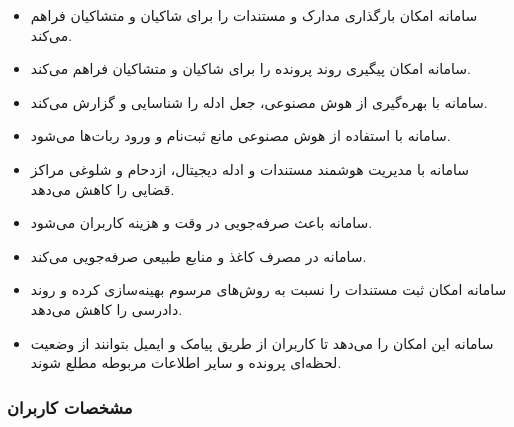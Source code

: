 \documentclass[12pt,a4paper,oneside]{article}
\begin{document}
	\begin{itemize}
		\item 
		سامانه امکان بارگذاری مدارک و مستندات را برای شاکیان و متشاکیان فراهم می‌کند.
	
		\item 
		سامانه امکان پیگیری روند پرونده را برای شاکیان و متشاکیان فراهم می‌کند.
	
		\item 
		سامانه با بهره‌گیری از هوش مصنوعی، جعل ادله را شناسایی و گزارش می‌کند.
	
		\item 
		سامانه با استفاده از هوش مصنوعی مانع ثبت‌نام و ورود ربات‌ها می‌شود.
	
		\item 
		سامانه با مدیریت هوشمند مستندات و ادله دیجیتال، ازدحام و شلوغی مراکز قضایی را کاهش می‌دهد.
	
		\item 
		سامانه باعث صرفه‌جویی در وقت و هزینه کاربران می‌شود.
	
		\item 
		سامانه در مصرف کاغذ و منابع طبیعی صرفه‌جویی می‌کند.
	
		\item 
		سامانه امکان ثبت مستندات را نسبت به روش‌های مرسوم بهینه‌سازی کرده و روند دادرسی را کاهش می‌دهد.
	
		\item 
		سامانه این امکان را می‌دهد تا کاربران از طریق پیامک و ایمیل بتوانند از وضعیت لحظه‌ای پرونده و سایر اطلاعات مربوطه مطلع شوند.
	\end{itemize}
	
			\subsubsection{مشخصات کاربران}
\end{document}

